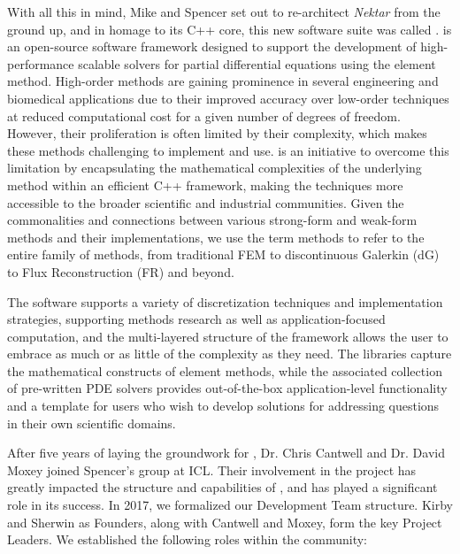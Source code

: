 With all this in mind, Mike and Spencer set out to re-architect \emph{Nektar} from the ground up, and in homage
to its C++ core, this new software suite was called \nek{}.  \nek{} 
is an open-source software framework designed to support the development
of high-performance scalable solvers for partial differential equations using
the \shp{} element method. High-order methods are gaining prominence in
several engineering and biomedical applications due to their improved accuracy
over low-order techniques at reduced computational cost for a given number of degrees of freedom. However,
their proliferation is often limited by their complexity, which makes
these methods challenging to implement and use. \nek{} is an initiative to
overcome this limitation by encapsulating the mathematical complexities of the underlying method within an
efficient C++ framework, making the techniques more accessible to the broader 
scientific and industrial communities.  Given the commonalities and connections between various strong-form
and weak-form methods and their implementations, we use the term \shp methods to refer to the entire family of
methods, from traditional FEM to discontinuous Galerkin (dG) to Flux Reconstruction (FR) and beyond.

The software supports a variety of discretization techniques and implementation
strategies, supporting methods research as well as application-focused
computation, and the multi-layered structure of the framework allows the user to
embrace as much or as little of the complexity as they need. The
libraries capture the mathematical constructs of \shp{} element methods,
while the associated collection of pre-written PDE solvers provides
out-of-the-box application-level functionality and a template for users who wish to develop
solutions for addressing questions in their own scientific domains.

After five years of laying the groundwork for \nek{}, Dr. Chris Cantwell and Dr. David Moxey joined
Spencer's group at ICL.  Their involvement in the project has greatly impacted the structure and
capabilities of \nek{}, and has played a significant role in its success.  In 2017, we formalized
our Development Team structure.  Kirby and Sherwin as Founders, along with Cantwell and Moxey,
form the key Project Leaders. We established the following roles within the \nek{} community:

